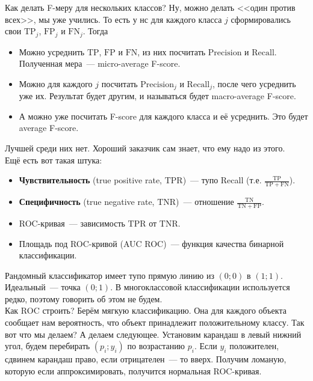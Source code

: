 \documentclass{article}
\begin{document}
    Как делать F-меру для нескольких классов? Ну, можно делать <<один против всех>>, мы уже учились. То есть у нс для каждого класса $j$ сформировались свои $\mathrm{TP}_j$, $\mathrm{FP}_j$ и $\mathrm{FN}_j$. Тогда
    \begin{itemize}
        \item Можно усреднить $\mathrm{TP}$, $\mathrm{FP}$ и $\mathrm{FN}$, из них посчитать $\mathrm{Precision}$ и $\mathrm{Recall}$. Полученная мера~--- micro-average F-score.
        \item Можно для каждого $j$ посчитать $\mathrm{Precision}_j$ и $\mathrm{Recall}_j$, после чего усреднить уже их. Результат будет другим, и называться будет macro-average F-score.
        \item А можно уже посчитать F-score для каждого класса и её усреднить. Это будет average F-score.
    \end{itemize}
    Лучшей среди них нет. Хороший заказчик сам знает, что ему надо из этого.\\
    Ещё есть вот такая штука:
    \begin{itemize}
        \item \textbf{Чувствительность} (true positive rate, $\mathrm{TPR}$)~--- тупо Recall (т.е. $\frac{\mathrm{TP}}{\mathrm{TP}+\mathrm{FN}}$).
        \item \textbf{Специфичность} (true negative rate, $\mathrm{TNR}$)~--- отношение $\frac{\mathrm{TN}}{\mathrm{TN}+\mathrm{FP}}$.
        \item ROC-кривая~--- зависимость $\mathrm{TPR}$ от $\mathrm{TNR}$.
        \item Площадь под ROC-кривой (AUC ROC)~--- функция качества бинарной классификации.
    \end{itemize}
    Рандомный классификатор имеет тупо прямую линию из $(0;0)$ в $(1;1)$. Идеальный~--- точка $(0;1)$. В многоклассовой классификации используется редко, поэтому говорить об этом не будем.\\
    Как ROC строить? Берём мягкую классификацию. Она для каждого объекта сообщает нам вероятность, что объект принадлежит положительному классу. Так вот что мы делаем? А делаем следующее. Установим карандаш в левый нижний угол, будем перебирать $(p_i;y_i)$ по возрастанию $p_i$. Если $y_i$ положителен, сдвинем карандаш право, если отрицателен~--- то вверх. Получим ломаную, которую если аппроксимировать, получится нормальная ROC-кривая.
\end{document}
